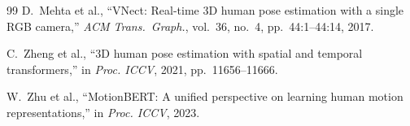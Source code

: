 \documentclass[twocolumn]{article}
\begin{document}
\begin{thebibliography}{99}
D.~Mehta et al.,
``VNect: Real-time 3D human pose estimation with a single RGB camera,''
\textit{ACM Trans.\ Graph.}, vol.~36, no.~4, pp.~44:1--44:14, 2017.

C.~Zheng et al.,
``3D human pose estimation with spatial and temporal transformers,''
in \textit{Proc. ICCV}, 2021, pp.~11656--11666.

W.~Zhu et al.,
``MotionBERT: A unified perspective on learning human motion
representations,''
in \textit{Proc. ICCV}, 2023.

\end{thebibliography}
\end{document}
